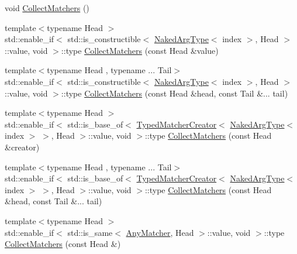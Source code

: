 \begin{DoxyCompactItemize}
\item 
void \mbox{\hyperlink{classfakeit_1_1MatchersCollector_a2d9a08a347c3915daa33f307a274f13c}{Collect\+Matchers}} ()
\item 
{\footnotesize template$<$typename Head $>$ }\\std\+::enable\+\_\+if$<$ std\+::is\+\_\+constructible$<$ \mbox{\hyperlink{classfakeit_1_1MatchersCollector_aeda8ced6a2f0cb7c6e4f916f18a91730}{Naked\+Arg\+Type}}$<$ index $>$, Head $>$\+::value, void $>$\+::type \mbox{\hyperlink{classfakeit_1_1MatchersCollector_affd243a89f758239d77c70dce6318087}{Collect\+Matchers}} (const Head \&value)
\item 
{\footnotesize template$<$typename Head , typename ... Tail$>$ }\\std\+::enable\+\_\+if$<$ std\+::is\+\_\+constructible$<$ \mbox{\hyperlink{classfakeit_1_1MatchersCollector_aeda8ced6a2f0cb7c6e4f916f18a91730}{Naked\+Arg\+Type}}$<$ index $>$, Head $>$\+::value, void $>$\+::type \mbox{\hyperlink{classfakeit_1_1MatchersCollector_a29c5245d03b8fab3773455c087edde74}{Collect\+Matchers}} (const Head \&head, const Tail \&... tail)
\item 
{\footnotesize template$<$typename Head $>$ }\\std\+::enable\+\_\+if$<$ std\+::is\+\_\+base\+\_\+of$<$ \mbox{\hyperlink{structfakeit_1_1TypedMatcherCreator}{Typed\+Matcher\+Creator}}$<$ \mbox{\hyperlink{classfakeit_1_1MatchersCollector_aeda8ced6a2f0cb7c6e4f916f18a91730}{Naked\+Arg\+Type}}$<$ index $>$ $>$, Head $>$\+::value, void $>$\+::type \mbox{\hyperlink{classfakeit_1_1MatchersCollector_ae954aa74286bcd096169067f5e897356}{Collect\+Matchers}} (const Head \&creator)
\item 
{\footnotesize template$<$typename Head , typename ... Tail$>$ }\\std\+::enable\+\_\+if$<$ std\+::is\+\_\+base\+\_\+of$<$ \mbox{\hyperlink{structfakeit_1_1TypedMatcherCreator}{Typed\+Matcher\+Creator}}$<$ \mbox{\hyperlink{classfakeit_1_1MatchersCollector_aeda8ced6a2f0cb7c6e4f916f18a91730}{Naked\+Arg\+Type}}$<$ index $>$ $>$, Head $>$\+::value, void $>$\+::type \mbox{\hyperlink{classfakeit_1_1MatchersCollector_a40994e9802e933fb1bae91870d666dcb}{Collect\+Matchers}} (const Head \&head, const Tail \&... tail)
\item 
{\footnotesize template$<$typename Head $>$ }\\std\+::enable\+\_\+if$<$ std\+::is\+\_\+same$<$ \mbox{\hyperlink{structfakeit_1_1AnyMatcher}{Any\+Matcher}}, Head $>$\+::value, void $>$\+::type \mbox{\hyperlink{classfakeit_1_1MatchersCollector_a89350af9ba2e7aaead8bd7b007f03631}{Collect\+Matchers}} (const Head \&)

\end{DoxyCompactItemize}
